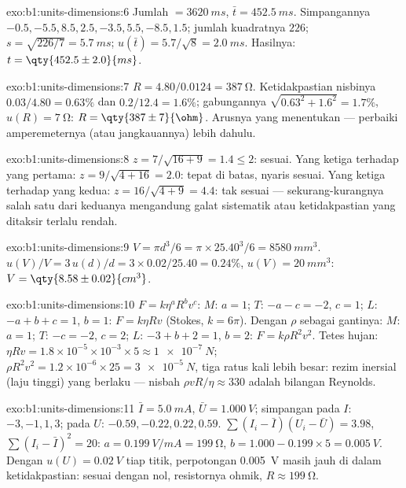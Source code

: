 \begin{solution}{exo:b1:units-dimensions:6}
Jumlah $= \qty{3620}{ms}$, $\bar t = \qty{452.5}{ms}$. Simpangannya
$-0.5, -5.5, 8.5, 2.5, -3.5, 5.5, -8.5, 1.5$; jumlah kuadratnya $226$;
$s = \sqrt{226/7} = \qty{5.7}{ms}$; $u(\bar t) = 5.7/\sqrt8 = \qty{2.0}{ms}$.
Hasilnya: $t = \qty{452.5\pm2.0}{ms}$.
\end{solution}

\begin{solution}{exo:b1:units-dimensions:7}
$R = 4.80/0.0124 = \qty{387}{\ohm}$. Ketidakpastian nisbinya $0.03/4.80 =
0.63\%$ dan $0.2/12.4 = 1.6\%$; gabungannya $\sqrt{0.63^2 + 1.6^2} = 1.7\%$,
$u(R) = \qty{7}{\ohm}$: $R = \qty{387\pm7}{\ohm}$. Arusnya yang
menentukan --- perbaiki amperemeternya (atau jangkauannya) lebih dahulu.
\end{solution}

\begin{solution}{exo:b1:units-dimensions:8}
$z = 7/\sqrt{16 + 9} = 1.4 \leq 2$: sesuai.
Yang ketiga terhadap yang pertama: $z = 9/\sqrt{4 + 16} = 2.0$: tepat di
batas, nyaris sesuai. Yang ketiga terhadap yang kedua: $z = 16/\sqrt{4 + 9} = 4.4$:
tak sesuai --- sekurang-kurangnya salah satu dari keduanya mengandung
galat sistematik atau ketidakpastian yang ditaksir terlalu rendah.
\end{solution}

\begin{solution}{exo:b1:units-dimensions:9}
$V = \pi d^3/6 = \pi \times 25.40^3/6 = \qty{8580}{mm^3}$.
$u(V)/V = 3\,u(d)/d = 3 \times 0.02/25.40 = 0.24\%$,
$u(V) = \qty{20}{mm^3}$: $V = \qty{8.58\pm0.02}{cm^3}$.
\end{solution}

\begin{solution}{exo:b1:units-dimensions:10}
$F = k\eta^a R^b v^c$: $M$: $a = 1$; $T$: $-a - c = -2$, $c = 1$;
$L$: $-a + b + c = 1$, $b = 1$: $F = k\eta R v$ (Stokes, $k = 6\pi$).
Dengan $\rho$ sebagai gantinya: $M$: $a = 1$; $T$: $-c = -2$, $c = 2$; $L$:
$-3 + b + 2 = 1$, $b = 2$: $F = k\rho R^2 v^2$.
Tetes hujan: $\eta R v = 1.8\times10^{-5} \times 10^{-3} \times 5 \approx
\qty{1e-7}{N}$; $\rho R^2 v^2 = 1.2 \times 10^{-6} \times 25 =
\qty{3e-5}{N}$, tiga ratus kali lebih besar: rezim inersial (laju
tinggi) yang berlaku --- nisbah $\rho v R/\eta \approx 330$ adalah
bilangan Reynolds.
\end{solution}

\begin{solution}{exo:b1:units-dimensions:11}
$\bar I = \qty{5.0}{mA}$, $\bar U = \qty{1.000}{V}$; simpangan pada $I$:
$-3, -1, 1, 3$; pada $U$: $-0.59, -0.22, 0.22, 0.59$.
$\sum (I_i - \bar I)(U_i - \bar U) = 3.98$, $\sum (I_i - \bar I)^2 = 20$:
$a = \qty{0.199}{V/mA} = \qty{199}{\ohm}$, $b = 1.000 - 0.199 \times 5 =
\qty{0.005}{V}$. Dengan $u(U) = \qty{0.02}{V}$ tiap titik, perpotongan
\qty{0.005}{V} masih jauh di dalam ketidakpastian: sesuai dengan nol,
resistornya ohmik, $R \approx \qty{199}{\ohm}$.
\end{solution}

